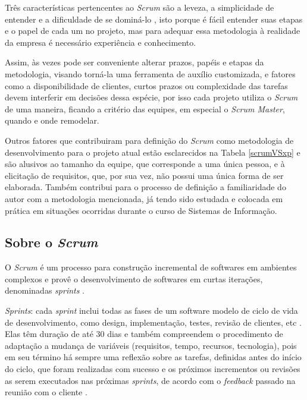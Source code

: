 Três características pertencentes ao \textit{Scrum} são a leveza, a simplicidade de entender e a dificuldade de se dominá-lo , isto porque é fácil entender suas etapas e o papel de cada um no projeto, mas para adequar essa metodologia à realidade da empresa é necessário experiência e conhecimento.

Assim, às vezes pode ser conveniente alterar prazos, papéis e etapas da metodologia, visando torná-la uma ferramenta de auxílio customizada, e fatores como a disponibilidade de clientes, curtos prazos ou complexidade das tarefas devem interferir em decisões dessa espécie, por isso cada projeto utiliza o \textit{Scrum} de uma maneira, ficando a critério das equipes, em especial o \textit{Scrum Master}, quando e onde remodelar.

Outros fatores que contribuiram para definição do \textit{Scrum} como metodologia de desenvolvimento para o projeto atual estão esclarecidos na Tabela \ref{scrumVSxp} e são alusivos ao tamanho da equipe, que corresponde a uma única pessoa, e à elicitação de requisitos, que, por sua vez, não possui uma única forma de ser elaborada. Também contribui para o processo de definição a familiaridade do autor com a metodologia mencionada, já tendo sido estudada e colocada em prática em situações ocorridas durante o curso de Sistemas de Informação.
 
\hspace{2.5cm}
\subsection{Sobre o \textit{Scrum}}
\hspace{2.5cm}

O \textit{Scrum} é um processo para construção incremental de softwares em ambientes complexos e provê o desenvolvimento de softwares em curtas iterações, denominadas \textit{sprints} .

\textit{Sprints}: cada \textit{sprint} inclui todas as fases de um software modelo de ciclo de vida de desenvolvimento, como design, implementação, testes, revisão de clientes, etc \cite[~p. 2, tradução nossa]{matharu2015empirical}. Elas têm duração de até 30 dias e também compreendem o procedimento de adaptação a mudança de variáveis (requisitos, tempo, recursos, tecnologia), pois em seu término há sempre uma reflexão sobre as tarefas, definidas antes do início do ciclo, que foram realizadas com sucesso e os próximos incrementos ou revisões as serem executados nas próximas \textit{sprints}, de acordo com o \textit{feedback} passado na reunião com o cliente . 

